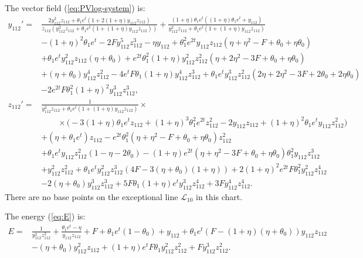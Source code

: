 The vector field  (\ref{eq:PVlog-system}) is:
$$
\begin{aligned}
y_{112}'=&
\frac{2 y_{112}^2 z_{112} + \theta_1 e^t (1 + 2 (1 + \eta) y_{112} z_{112})}{z_{112} (y_{112}^2 z_{112} + \theta_1 e^t (1 + (1 + \eta) y_{112} z_{112}))}
+
\frac{(1 + \eta) \theta_1 e^t ((1 + \eta) \theta_1 e^t + y_{112})}
{y_{112}^2 z_{112} + \theta_1 e^t (1 + (1 + \eta) y_{112} z_{112})}
\\&
-(1+\eta)^2\theta_1 e^t   - 
 2 F y_{112}^5 z_{112}^3 -\eta  y_{112}+
\theta_1^2 e^{2t} y_{112}z_{112} ( \eta   + \eta^2    - 
     F   +  \theta_0   + \eta    \theta_0  ) 
\\&     
     + 
 \theta_1 e^t  y_{112}^2 z_{112}(\eta  + \theta_0  ) + 
e^{2t} \theta_1^2 (1+\eta) y_{112}^2 z_{112}^2(    \eta   + 2 \eta^2  - 3  F     + \theta_0  + \eta \theta_0   ) 
\\&    
    + 
(\eta  + \theta_0) y_{112}^4 z_{112}^2 -4 e^t F \theta_1(1+\eta) y_{112}^4 z_{112}^3
 +\theta_1 e^t y_{112}^3 z_{112}^2(2 \eta  + 2 \eta^2  -     3  F + 2  \theta_0   +     2 \eta  \theta_0 )     
\\&     
    -2 e^{2t} F \theta_1^2(1  +   \eta)^2  y_{112}^3z_{112}^3
,
\\
z_{112}'=&
\frac{1}{y_{112}^2 z_{112} + \theta_1 e^t  (1 + (1 + \eta) y_{112} z_{112})}
\times
\\
&\qquad\times
\big(
{-}3 (1+\eta)\theta_1 e^t  z_{112} + (1+\eta)^3 \theta_1^2  e^{2t} z_{112}^2  
-2  y_{112} z_{112} + (1+\eta)^2\theta_1 e^t y_{112}   z_{112}^2 
\big)
\\&
+
(\eta  + \theta_1 e^t)  z_{112} 
- e^{2t} \theta_1^2(\eta  +  \eta^2  -  F   +   \theta_0   + \eta  \theta_0 ) z_{112}^2 
\\&
+ \theta_1 e^t  y_{112}  z_{112}^2(1  - \eta  - 2  \theta_0  )
-(1 + \eta) e^{2t} (\eta + \eta^2 - 3 F + \theta_0 +  \eta \theta_0) \theta_1^2 y_{112} z_{112}^3
\\&
 + y_{112}^2z_{112}^2
 +\theta_1 e^t  y_{112}^2z_{112}^3 (  4 F -  3 (\eta+\theta_0)(1+\eta)) 
    +2 (1+\eta)^2e^{2t} F \theta_1^2 y_{112}^2  z_{112}^4
\\& 
  -2(\eta+\theta_0) y_{112}^3 z_{112}^3  
 + 5F \theta_1( 1  +    \eta  ) e^{t} y_{112}^3z_{112}^4 
 + 3 F y_{112}^4 z_{112}^4 
.
\end{aligned}
$$
There are no base points on the exceptional line $\mathcal{L}_{10}$ in this chart.

The energy (\ref{eq:E}) is:
$$
\begin{aligned}
E=&
\frac{1}{y_{112}^2 z_{112}^2}
+\frac{\theta_1 e^t-\eta}{y_{112} z_{112}}
+F +\theta_1 e^t(1-  \theta_0)
+y_{112}
+\theta_1 e^t(F -(1+\eta)(\eta+\theta_0))y_{112} z_{112}
\\
&
-(\eta+\theta_0) y_{112}^2 z_{112}
+(1+\eta) e^{t} F \theta_1 y_{112}^2 z_{112}^2
+F y_{112}^3 z_{112}^2
.
\end{aligned}
$$



